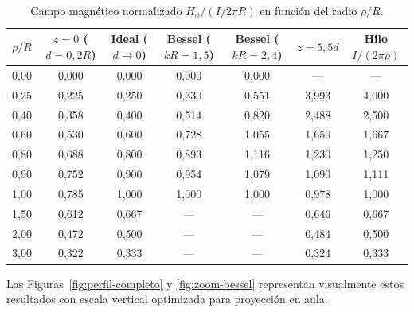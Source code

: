\documentclass[11pt]{article}
\begin{document}
\begin{table}[ht]
\centering
\small
\setlength{\tabcolsep}{4.5pt}
\caption{Campo magnético normalizado $H_\phi / (I / 2\pi R)$ en función del radio $\rho/R$.}
\label{tab:comparacion}
\begin{tabular}{@{}ccccccc@{}}
\toprule
$\rho / R$ & $z = 0$ ($d=0{,}2R$) & Ideal ($d\to 0$) & Bessel ($kR=1{,}5$) & Bessel ($kR=2{,}4$) & $z = 5{,}5d$ & Hilo $I/(2\pi\rho)$ \\
\midrule
0,00 & 0,000 & 0,000 & 0,000 & 0,000 & ---   & ---   \\
0,25 & 0,225 & 0,250 & 0,330 & 0,551 & 3,993 & 4,000 \\
0,40 & 0,358 & 0,400 & 0,514 & 0,820 & 2,488 & 2,500 \\
0,60 & 0,530 & 0,600 & 0,728 & 1,055 & 1,650 & 1,667 \\
0,80 & 0,688 & 0,800 & 0,893 & 1,116 & 1,230 & 1,250 \\
0,90 & 0,752 & 0,900 & 0,954 & 1,079 & 1,090 & 1,111 \\
1,00 & 0,785 & 1,000 & 1,000 & 1,000 & 0,978 & 1,000 \\
1,50 & 0,612 & 0,667 & ---   & ---   & 0,646 & 0,667 \\
2,00 & 0,472 & 0,500 & ---   & ---   & 0,484 & 0,500 \\
3,00 & 0,322 & 0,333 & ---   & ---   & 0,324 & 0,333 \\
\bottomrule
\end{tabular}
\end{table}

Las Figuras~\ref{fig:perfil-completo} y \ref{fig:zoom-bessel} representan visualmente estos resultados con escala vertical optimizada para proyección en aula.
\end{document}
